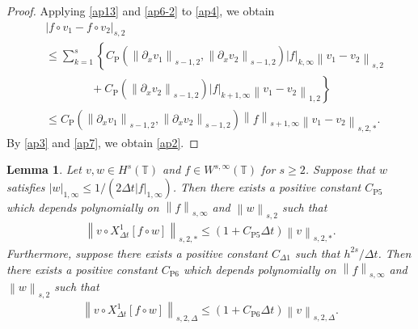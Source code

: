 \documentclass[10pt,a4paper,tbtags,leqno]{amsart}
\newtheorem{lemma}[theorem]{Lemma}
\theoremstyle{definition}
\numberwithin{equation}{section}
\def\norm#1#2{\left\|#2\right\|_{#1}}
\def\snorm#1#2{\left|#2\right|_{#1}}
\begin{document}
\begin{proof}
  Applying \eqref{ap13} and \eqref{ap6-2} to \eqref{ap4}, we obtain 
  \begin{align}
    & \snorm{s, 2}{f \circ v_1 - f \circ v_2} \\
    & \leq \sum_{k=1}^{s} \left\{C_{\mathrm{P}} (\norm{s - 1, 2}{\partial_x v_1}, \norm{s - 1, 2}{\partial_x v_2}) \snorm{k, \infty}{f} \norm{s, 2}{v_1 - v_2} \right. \\ & \qquad \qquad + \left. C_{\mathrm{P}} (\norm{s - 1, 2}{\partial_x v_2}) \snorm{k + 1, \infty}{f} \norm{1, 2}{v_1 - v_2} \right\} \\
    & \leq C_{\mathrm{P}} (\norm{s - 1, 2}{\partial_x v_1}, \norm{s - 1, 2}{\partial_x v_2}) \norm{s + 1, \infty}{f} \norm{s, 2, \ast}{v_1 - v_2}. 
    \label{ap7}
  \end{align}
  By \eqref{ap3} and \eqref{ap7}, we obtain \eqref{ap2}. 
\end{proof} 

\begin{lemma}\label{lem:c} 
  Let $ v, w \in H^s (\mathbb{T}) $ and $ f \in W^{s,\infty} (\mathbb{T}) $ for $ s \geq 2 $. 
  Suppose that $ w $ satisfies $ \snorm{1, \infty}{w} \leq 1 / (2 \Delta t \snorm{1, \infty}{f}) $. 
  Then there exists a positive constant $ C_{\mathrm{P}5} $ which depends polynomially on $ \norm{s, \infty}{f} $ and $ \norm{s, 2}{w} $ such that 
  \begin{align} 
    \norm{s, 2, \ast}{v \circ {X_{\Delta t}^1}[f \circ w]} \leq (1 + C_{\mathrm{P}5} \Delta t) \norm{s, 2, \ast}{v}. \label{c2} 
  \end{align} 
  Furthermore, suppose there exists a positive constant $ C_{\Delta 1} $ such that $ h^{2s} / \Delta t $. Then there exists a positive constant $ C_{\mathrm{P}6} $ which depends polynomially on $ \norm{s, \infty}{f} $ and $ \norm{s, 2}{w} $ such that 
  \begin{align} 
    \norm{s, 2, \Delta}{v \circ {X_{\Delta t}^1}[f \circ w]} \leq (1 + C_{\mathrm{P}6} \Delta t) \norm{s, 2, \Delta}{v}. \label{c2-2} 
  \end{align} 
\end{lemma} 
\end{document}
